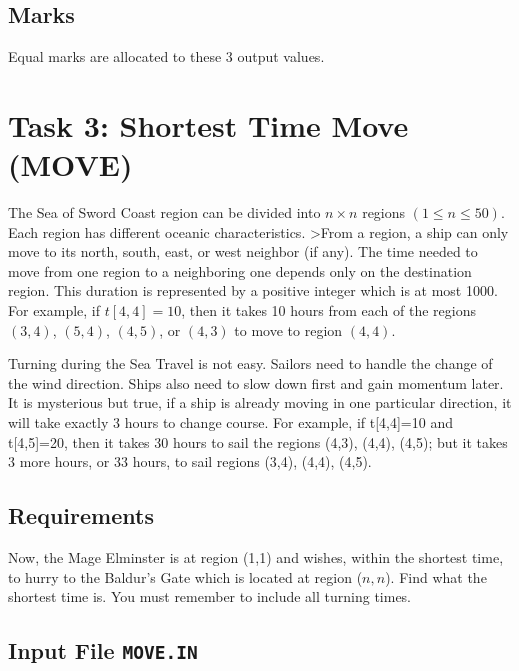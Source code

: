 \subsection{Marks}

Equal marks are allocated to these 3 output values.

\newpage

\section*{Task 3: Shortest Time Move (MOVE)}
\setcounter{section}{3}
\setcounter{subsection}{0}

The Sea of Sword Coast region can be divided into $n\times n$ regions
$(1 \leq n \leq 50)$.
Each region has different oceanic characteristics.
>From a region,
a ship can only move to its north, south, east, or west neighbor (if any).
The time needed to move from one region to a neighboring one depends
only on the destination region.
This duration is represented by a positive integer which is at most 1000. 
For example,
if $t[4,4]=10$,
then it takes 10 hours from each of the regions
$(3,4)$, $(5,4)$, $(4,5)$, or $(4,3)$
to move to region $(4,4)$.

Turning during the Sea Travel is not easy.
Sailors need to handle the change of the wind direction.
Ships also need to slow down first and gain momentum later.
It is mysterious but true,
if a ship is already moving in one particular direction,
it will take exactly 3 hours to change course.
For example, if t[4,4]=10 and t[4,5]=20,
then it takes 30 hours to sail the regions (4,3), (4,4), (4,5);
but it takes 3 more hours, or 33 hours, to sail regions
(3,4), (4,4), (4,5).

\begin{center}
\end{center}

\subsection{Requirements}

Now, the Mage Elminster is at region (1,1) and 
wishes, within the shortest time, to hurry to
the Baldur's Gate which is located at region ($n,n$).
Find what the shortest time is.
You must remember to include all turning times.

\subsection{Input File {\tt MOVE.IN}}

